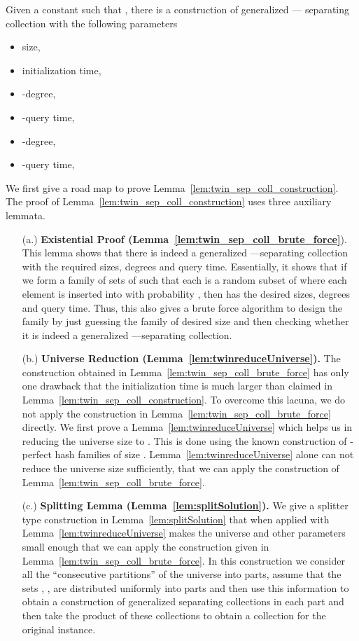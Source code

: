 \begin{lemma}
\label{lem:twin_sep_coll_construction}
Given a constant  such that , there is a construction of generalized --- separating collection with the following parameters
\begin{itemize} 
\setlength\itemsep{-.7mm}
\item size, 
\item initialization time, 
\item -degree, 
\item -query time, 
\item -degree, 
\item -query time, 
\end{itemize}
\end{lemma}

We first give a road map to prove Lemma~\ref{lem:twin_sep_coll_construction}. 
The proof of  Lemma~\ref{lem:twin_sep_coll_construction} uses three auxiliary lemmata. 
\begin{enumerate}
\item[(a.)] {\bf Existential Proof (Lemma~\ref{lem:twin_sep_coll_brute_force}}). This lemma shows that there is indeed a 
generalized ---separating collection with the required sizes, degrees and query time. Essentially, it shows that if we form a family   of sets of  such that each  is a random subset of  where each element  is inserted into  with probability , then  has the desired sizes, degrees and query time. Thus, this also gives a brute force algorithm to design the family  by just guessing the family of desired size and then checking whether it is indeed  a generalized ---separating collection. 
\item[(b.)]  {\bf Universe Reduction (Lemma~\ref{lem:twinreduceUniverse}).} The construction obtained in Lemma~\ref{lem:twin_sep_coll_brute_force} 
has only one drawback that the initialization time is much larger than claimed in Lemma~\ref{lem:twin_sep_coll_construction}. To overcome this lacuna, we do not apply the construction in Lemma~\ref{lem:twin_sep_coll_brute_force} directly. 
We first prove a Lemma~\ref{lem:twinreduceUniverse} which helps us in reducing the universe size to . This is done using the  known construction of -perfect hash families of size . 
Lemma~\ref{lem:twinreduceUniverse} alone  can not reduce the universe size sufficiently, that we can apply the construction of Lemma~\ref{lem:twin_sep_coll_brute_force}. 
\item[(c.)] {\bf Splitting Lemma (Lemma~\ref{lem:splitSolution}).} We give a splitter type construction in Lemma~\ref{lem:splitSolution} that when applied with 
Lemma~\ref{lem:twinreduceUniverse} makes the universe and other parameters small enough that we can apply the construction given in 
Lemma~\ref{lem:twin_sep_coll_brute_force}. In this construction we consider all the ``consecutive partitions''  of the universe into  parts, assume that the sets , , are distributed uniformly into  parts and then use this information to obtain a construction of generalized separating collections in each part and then take the product of these collections to obtain a collection for the original instance.
\end{enumerate}

